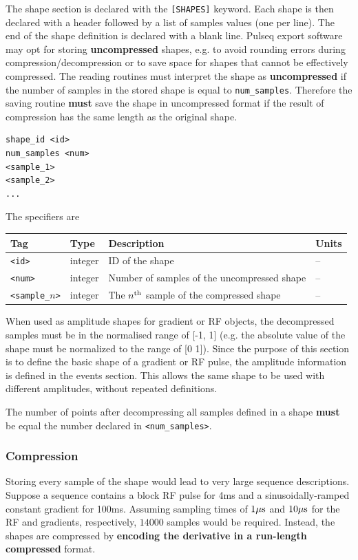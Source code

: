 \documentclass{article}
\begin{document}
The shape section is declared with the \verb.[SHAPES]. keyword. Each shape is then declared with a header followed by a list of samples values (one per line). The end of the shape definition is declared with a blank line. Pulseq export software may opt for storing \textbf{uncompressed} shapes, e.g. to avoid rounding errors during compression/decompression or to save space for shapes that cannot be effectively compressed. The reading routines must interpret the shape as \textbf{uncompressed} if the number of samples in the stored shape is equal to \verb.num_samples.. Therefore the saving routine \textbf{must} save the shape in uncompressed format if the result of compression has the same length as the original shape.

\begin{lstlisting}
shape_id <id>
num_samples <num>
<sample_1>
<sample_2>
...
\end{lstlisting}

The specifiers are

\begin{tabularx}{\textwidth}{llXl}
\toprule
Tag & Type & Description & Units\\
\midrule
\verb.<id>. & integer & ID of the shape & -- \\
\verb.<num>. & integer & Number of samples of the uncompressed shape & -- \\
\verb.<sample_.$n$\verb.>. & integer & The $n^{\rm th}$ sample of the compressed shape  & -- \\
\bottomrule
\end{tabularx}

When used as amplitude shapes for gradient or RF objects, the decompressed samples must be in the normalised range of [-1, 1] (e.g. the absolute value of the shape must be normalized to the range of [0 1]). Since the purpose of this section is to define the basic shape of a gradient or RF pulse, the amplitude information is defined in the events section. This allows the same shape to be used with different amplitudes, without repeated definitions.

The number of points after decompressing all samples defined in a shape \textbf{must} be equal the number declared in \verb.<num_samples>..

\subsubsection{Compression}

Storing every sample of the shape would lead to very large sequence descriptions. Suppose a sequence contains a block RF pulse for 4ms and a sinusoidally-ramped constant gradient for 100ms. Assuming sampling times of $1{\rm \mu s}$ and $10{\rm \mu s}$ for the RF and gradients, respectively, $14000$ samples would be required. Instead, the shapes are compressed by \textbf{encoding the derivative in a run-length compressed} format. 
\end{document}
